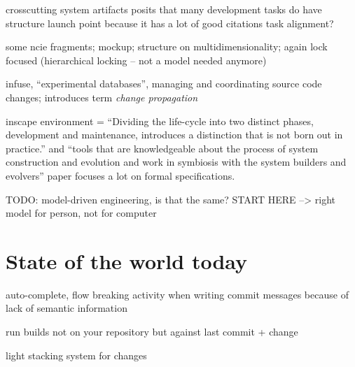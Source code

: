 \documentclass[conference]{IEEEtran}
\begin{document}
crosscutting system artifacts
posits that many development tasks do have structure
launch point because it has a lot of good citations
task alignment?~\cite{Murphy2005}

some ncie fragments; mockup; structure on multidimensionality; again lock focused (hierarchical locking -- not a model needed anymore)
~\cite{Chu-Carroll2003}

infuse, ``experimental databases'', managing and coordinating source code changes; introduces term \emph{change propagation}~\cite{Perry1987}

inscape environment = ``Dividing the life-cycle into two distinct phases, development and maintenance, introduces a distinction that is not born out in practice.'' and ``tools that are knowledgeable about the process of system construction and evolution and work in symbiosis with the system builders and evolvers'' paper focuses a lot on formal specifications.~\cite{Perry1989}






TODO: model-driven engineering, is that the same? START HERE
 --> right model for person, not for computer



\section{State of the world today}

auto-complete, flow breaking activity when writing commit messages because of lack of semantic information

run builds not on your repository but against last commit + change

light stacking system for changes
\end{document}
